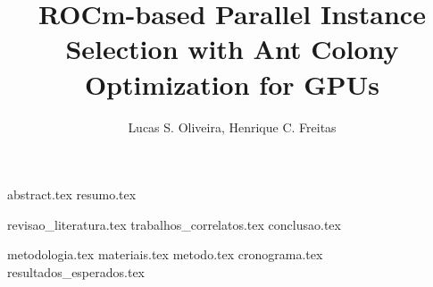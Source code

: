 \documentclass{article}
\title{ROCm-based Parallel Instance Selection with Ant Colony Optimization for GPUs}
\author{{Lucas S. Oliveira\inst{1}, Henrique C. Freitas\inst{1}}}
\begin{document}
\maketitle

{abstract.tex}
{resumo.tex}

{revisao_literatura.tex}
{trabalhos_correlatos.tex}
{conclusao.tex}

{metodologia.tex}
{materiais.tex}
{metodo.tex}
{cronograma.tex}
{resultados_esperados.tex}

\printbibliography
\end{document}
